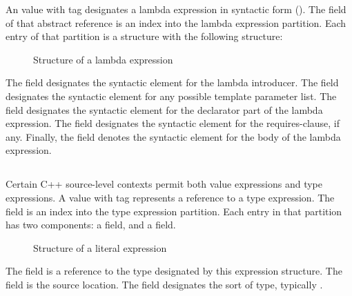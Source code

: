 An  value with tag  designates a lambda expression in syntactic form ().
The  field of that abstract reference is an index into the lambda expression partition.
Each entry of that partition is a structure with the following structure:
%
\begin{figure}[H]
	\centering
	\caption{Structure of a lambda expression}
	\label{fig:ifc-lambda-structure}
\end{figure}
%

The  field designates the syntactic element for the lambda introducer.
The  field designates the syntactic element for any possible template parameter list.
The  field designates the syntactic element for the declarator part of the lambda expression.
The  field designates the syntactic element for the requires-clause, if any.
Finally, the  field denotes the syntactic element for the body of the lambda expression. 





\subsection{}
\label{sec:ifc:ExprSort:Type}

Certain C++ source-level contexts permit both value expressions and type expressions.
A  value with tag  represents a reference to a type expression.
The  field is an index into the type expression partition.
Each entry in that partition has two components: a  field, and a  field.
%
\begin{figure}[H]
	\centering
	\caption{Structure of a literal expression}
	\label{fig:ifc-type-expr-structure}
\end{figure}
%
The  field is a reference to the type designated by this expression structure.
The  field is the source location.
The  field designates the sort of type, typically .

